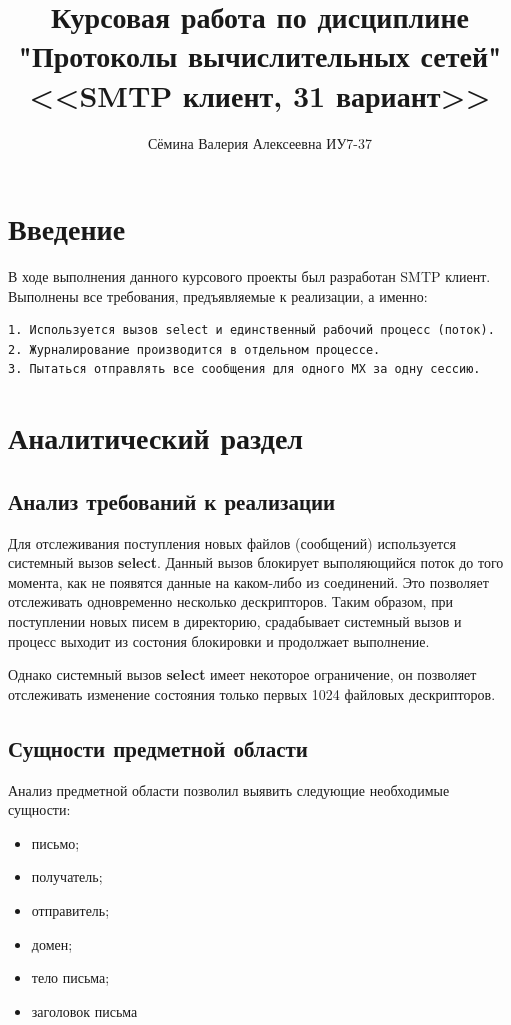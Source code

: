 \documentclass[a4paper,12pt]{article}
\title{ Курсовая работа по дисциплине \\ "Протоколы вычислительных сетей" \\ <<SMTP клиент, 31 вариант>>}
\author{Сёмина Валерия Алексеевна ИУ7-37}
\begin{document}
\maketitle

\tableofcontents

\section{Введение}

В ходе выполнения данного курсового проекты был разработан SMTP клиент.
Выполнены все требования, предъявляемые к реализации, а именно:

\begin{Verbatim}
1. Используется вызов select и единственный рабочий процесс (поток).
2. Журналирование производится в отдельном процессе.
3. Пытаться отправлять все сообщения для одного MX за одну сессию.
\end{Verbatim}

\section{Аналитический раздел}

\subsection{Анализ требований к реализации}

Для отслеживания поступления новых файлов (сообщений) используется системный вызов \textbf{select}. Данный вызов блокирует выполяющийся поток до того момента, как не появятся данные на каком-либо из соединений. Это позволяет отслеживать одновременно несколько дескрипторов. Таким образом, при поступлении новых писем в директорию, срадабывает системный вызов и процесс выходит из состония блокировки и продолжает выполнение.

Однако системный вызов \textbf{select} имеет некоторое ограничение, он позволяет отслеживать изменение состояния только первых 1024 файловых дескрипторов.

\subsection{Сущности предметной области}
Анализ предметной области позволил выявить следующие необходимые сущности:
\begin{itemize}
\item письмо;
\item получатель;
\item отправитель;
\item домен;
\item тело письма;
\item заголовок письма
\end{itemize}
\end{document}
